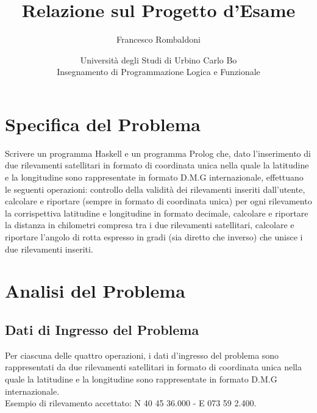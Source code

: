 \documentclass{article}
\title{\textbf{Relazione sul Progetto d'Esame}}
\author{Francesco Rombaldoni}
\date{\small Università degli Studi di Urbino Carlo Bo\\
	Insegnamento di Programmazione Logica e Funzionale}
\begin{document}
	\maketitle
	
	

\section{Specifica del Problema}
Scrivere un programma Haskell e un programma Prolog che, dato l'inserimento di due rilevamenti satellitari in formato di coordinata unica nella quale la latitudine e la longitudine sono rappresentate in formato D.M.G internazionale, effettuano le seguenti operazioni: controllo della validità dei rilevamenti inseriti dall'utente, calcolare e riportare (sempre in formato di coordinata unica) per ogni rilevamento la corrispettiva latitudine e longitudine in formato decimale, calcolare e riportare la distanza in chilometri compresa tra i due rilevamenti satellitari, calcolare e riportare l'angolo di rotta espresso in gradi (sia diretto che inverso) che unisce i due rilevamenti inseriti.
\newline
\newline
\newpage
			
\section{Analisi del Problema}
\subsection{Dati di Ingresso del Problema}
Per ciascuna delle quattro operazioni, i dati d'ingresso del problema sono rappresentati da due rilevamenti satellitari in formato di coordinata unica nella quale la latitudine e la longitudine sono rappresentate in formato D.M.G internazionale. \\
Esempio di rilevamento accettato: N 40 45 36.000 - E 073 59 2.400.
\end{document}
